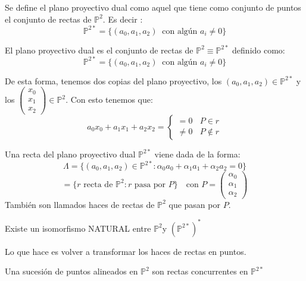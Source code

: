 \begin{ndef}
	Se define el plano proyectivo dual como aquel que tiene como conjunto de puntos el conjunto de rectas de $\mathbb{P}^2$. Es decir :
	$$\mathbb{P}^{2*} = \{ (a_0,a_1,a_2) \ \text{ con algún $a_i\ne 0$}\}$$
\end{ndef}

\begin{ndef}
	El plano proyectivo dual es el conjunto de rectas de $\mathbb P ^2 \equiv \mathbb P^{2*}$ definido como:
	\[
	\mathbb P^{2*} = \{ (a_0,a_1,a_2) \ \text{ con algún $a_i\ne 0$}\}
	\]
\end{ndef}
De esta forma, tenemos dos copias del plano proyectivo, los $(a_0,a_1,a_2)\in \mathbb P^{2*}$ y los $\begin{pmatrix}
 x_0\\
 x_1\\
 x_2
\end{pmatrix}  \in \mathbb P ^2$. Con esto tenemos que:
\[
a_0 x_0 + a_1x_1 + a_2x_2 = \begin{cases}
	=0 \ \ \ \ P \in r\\
	\ne 0 \ \ \ \ P \notin r
\end{cases}
\]

\begin{ndef}
	Una recta del plano proyectivo dual $\mathbb P^{2*}$ viene dada de la forma:
	\[
	\Lambda = \{ (a_0, a_1,a_2) \in \mathbb P^{2*} : \alpha_0a_0 + \alpha_1 a_1 + \alpha_2 a_2 = 0\}
	\]
	\[
	= \{ r \text{ recta de } \mathbb P ^2  : r \text { pasa por } P\} \ \ \ \text{ con } P = \begin{pmatrix}
 \alpha_0\\
 \alpha_1\\
 \alpha_2
\end{pmatrix}
	\]
	También son llamados haces de rectas de $\mathbb P^2$ que pasan por $P$.
\end{ndef}

\begin{nth}
	Existe un isomorfismo NATURAL entre $\mathbb P^2 $y $(\mathbb P^{2*})^*$
\end{nth}
\begin{nota}
	Lo que hace es volver a transformar los haces de rectas en puntos.
\end{nota}

\begin{nprop}[Propiedades]
	\begin{nlist}
	\item Una sucesión de puntos alineados en $\mathbb P^2$ son rectas concurrentes en $\mathbb P^{2*}$
\end{nlist}
\end{nprop}

